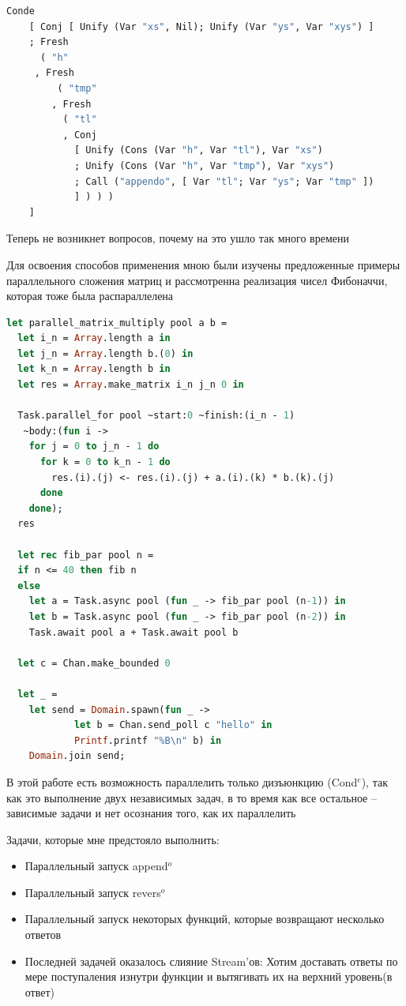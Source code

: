 \begin{lstlisting}[caption=Append$^o$, language=OCaml, frame=single]
  Conde
    [ Conj [ Unify (Var "xs", Nil); Unify (Var "ys", Var "xys") ]
    ; Fresh
      ( "h"
     , Fresh
         ( "tmp"
        , Fresh
          ( "tl"
          , Conj
            [ Unify (Cons (Var "h", Var "tl"), Var "xs")
            ; Unify (Cons (Var "h", Var "tmp"), Var "xys")
            ; Call ("appendo", [ Var "tl"; Var "ys"; Var "tmp" ])
            ] ) ) )
    ]
\end{lstlisting}

Теперь не возникнет вопросов, почему на это ушло так много времени

Для освоения способов применения мною были изучены предложенные примеры параллельного сложения матриц
и рассмотренна реализация чисел Фибоначчи, которая тоже была распараллелена

\begin{lstlisting}[caption=Domainslib, language=OCaml, frame=single]
  let parallel_matrix_multiply pool a b =
  let i_n = Array.length a in
  let j_n = Array.length b.(0) in
  let k_n = Array.length b in
  let res = Array.make_matrix i_n j_n 0 in

  Task.parallel_for pool ~start:0 ~finish:(i_n - 1)
   ~body:(fun i ->
    for j = 0 to j_n - 1 do
      for k = 0 to k_n - 1 do
        res.(i).(j) <- res.(i).(j) + a.(i).(k) * b.(k).(j)
      done
    done);
  res

  let rec fib_par pool n =
  if n <= 40 then fib n
  else
    let a = Task.async pool (fun _ -> fib_par pool (n-1)) in
    let b = Task.async pool (fun _ -> fib_par pool (n-2)) in
    Task.await pool a + Task.await pool b
  
  let c = Chan.make_bounded 0

  let _ =
    let send = Domain.spawn(fun _ ->
            let b = Chan.send_poll c "hello" in
            Printf.printf "%B\n" b) in
    Domain.join send;
\end{lstlisting}

В этой работе есть возможность параллелить только дизъюнкцию (Cond$^e$), так как это выполнение двух независимых задач,
в то время как все остальное -- зависимые задачи и нет осознания того, как их параллелить

Задачи, которые мне предстояло выполнить:
\begin{itemize}
  \item Параллельный запуск append$^o$
\item Параллельный запуск revers$^o$ 
\item Параллельный запуск некоторых функций, которые возвращают
несколько ответов
\item Последней задачей оказалось слияние Stream’ов: Хотим доставать
ответы по мере поступаления изнутри функции и вытягивать их на
верхний уровень(в ответ)
\end{itemize}

